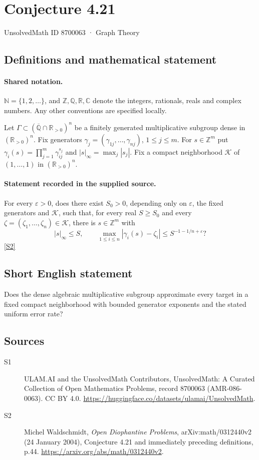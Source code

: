 \documentclass[11pt]{article}
\newcommand{\sref}[2]{\hyperlink{source:#1:#2}{[S#2]}}
\begin{document}
\setcounter{section}{8700062}
\section{Conjecture 4.21}\label{8700063}
{\small\sffamily UnsolvedMath ID 8700063 · Graph Theory}
\subsection{Definitions and mathematical statement}

\paragraph{Shared notation.}$\mathbb N=\{1,2,\ldots\}$, and $\mathbb Z,\mathbb Q,\mathbb R,\mathbb C$ denote the integers, rationals, reals and complex numbers. Any other conventions are specified locally.


Let $\Gamma\subset(\overline{\mathbb Q}\cap\mathbb R_{>0})^n$ be a finitely generated multiplicative subgroup dense in $(\mathbb R_{>0})^n$. Fix generators $\gamma_j=(\gamma_{1j},\ldots,\gamma_{nj})$, $1\le j\le m$. For $s\in\mathbb Z^m$ put $\gamma_i(s)=\prod_{j=1}^m\gamma_{ij}^{s_j}$ and $|s|_\infty=\max_j|s_j|$. Fix a compact neighborhood $\mathcal K$ of $(1,\ldots,1)$ in $(\mathbb R_{>0})^n$.
\paragraph{Statement recorded in the supplied source.}
For every $\varepsilon>0$, does there exist $S_0>0$, depending only on $\varepsilon$, the fixed generators and $\mathcal K$, such that, for every real $S\ge S_0$ and every $\zeta=(\zeta_1,\ldots,\zeta_n)\in\mathcal K$, there is $s\in\mathbb Z^m$ with
\[
|s|_\infty\le S,\qquad \max_{1\le i\le n}|\gamma_i(s)-\zeta_i|\le S^{-1-1/n+\varepsilon}?
\] \sref{8700063}{2}

\subsection{Short English statement}
Does the dense algebraic multiplicative subgroup approximate every target in a fixed compact neighborhood with bounded generator exponents and the stated uniform error rate?
\subsection{Sources}
\begin{description}
\item[\hypertarget{source:8700063:1}{S1}] ULAM.AI and the UnsolvedMath Contributors, UnsolvedMath: A Curated Collection of Open Mathematics Problems, record 8700063 (AMR-086-0063). CC BY 4.0. \url{https://huggingface.co/datasets/ulamai/UnsolvedMath}.
\item[\hypertarget{source:8700063:2}{S2}] Michel Waldschmidt, \emph{Open Diophantine Problems}, arXiv:math/0312440v2 (24 January 2004), Conjecture 4.21 and immediately preceding definitions, p.44. \url{https://arxiv.org/abs/math/0312440v2}.
\end{description}
\label{end:8700063}
\end{document}
